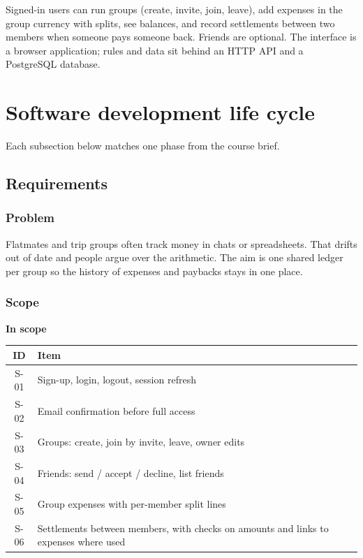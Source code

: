 \documentclass[11pt,a4paper]{article}
\begin{document}
Signed-in users can run groups (create, invite, join, leave), add expenses in the group currency with splits, see balances, and record settlements between two members when someone pays someone back. Friends are optional. The interface is a browser application; rules and data sit behind an HTTP API and a PostgreSQL database.

\section{Software development life cycle}

Each subsection below matches one phase from the course brief.

\subsection{Requirements}

\subsubsection{Problem}

Flatmates and trip groups often track money in chats or spreadsheets. That drifts out of date and people argue over the arithmetic. The aim is one shared ledger per group so the history of expenses and paybacks stays in one place.

\subsubsection{Scope}

\textbf{In scope}

\begin{center}
\begin{tabular}{@{}cl@{}}
\toprule
\textbf{ID} & \textbf{Item} \\
\midrule
S-01 & Sign-up, login, logout, session refresh \\
S-02 & Email confirmation before full access \\
S-03 & Groups: create, join by invite, leave, owner edits \\
S-04 & Friends: send / accept / decline, list friends \\
S-05 & Group expenses with per-member split lines \\
S-06 & Settlements between members, with checks on amounts and links to expenses where used \\
\bottomrule
\end{tabular}
\end{center}
\end{document}
